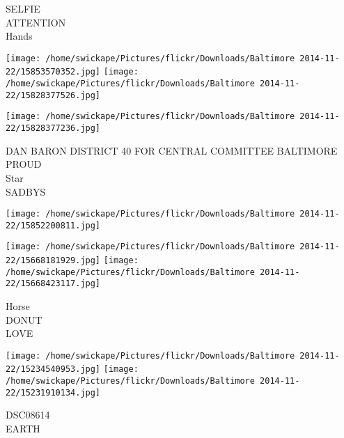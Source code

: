\documentclass[10pt,letterpaper]{article}
\begin{document}
SELFIE\\
ATTENTION\\
Hands\\
\pagebreak

\texttt{[image: /home/swickape/Pictures/flickr/Downloads/Baltimore 2014-11-22/15853570352.jpg]}
\texttt{[image: /home/swickape/Pictures/flickr/Downloads/Baltimore 2014-11-22/15828377526.jpg]}

\texttt{[image: /home/swickape/Pictures/flickr/Downloads/Baltimore 2014-11-22/15828377236.jpg]}

DAN BARON DISTRICT 40 FOR CENTRAL COMMITTEE BALTIMORE PROUD\\
Star\\
SADBYS\\
\pagebreak

\texttt{[image: /home/swickape/Pictures/flickr/Downloads/Baltimore 2014-11-22/15852200811.jpg]}

\vspace{0.25in}
\texttt{[image: /home/swickape/Pictures/flickr/Downloads/Baltimore 2014-11-22/15668181929.jpg]}
\texttt{[image: /home/swickape/Pictures/flickr/Downloads/Baltimore 2014-11-22/15668423117.jpg]}

Horse\\
DONUT\\
LOVE\\
\pagebreak

\texttt{[image: /home/swickape/Pictures/flickr/Downloads/Baltimore 2014-11-22/15234540953.jpg]}
\texttt{[image: /home/swickape/Pictures/flickr/Downloads/Baltimore 2014-11-22/15231910134.jpg]}

DSC08614\\
EARTH\\
\pagebreak
\end{document}
